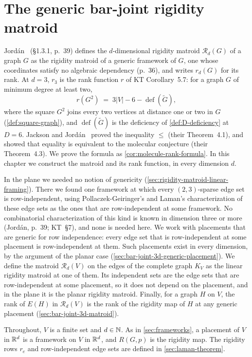 \section{The generic bar-joint rigidity matroid}
\label{sec:bar-joint-3d}

Jord\'an~\cite{jordan2016} (\S1.3.1, p.~39) defines the
$d$-dimensional rigidity matroid $\mathcal{R}_d(G)$ of a graph $G$ as
the rigidity matroid of a generic framework of $G$, one whose
coordinates satisfy no algebraic dependency (p.~36), and writes
$r_d(G)$ for its rank. At $d = 3$, $r_3$ is the rank function $r$ of
KT Corollary~5.7: for a graph $G$ of minimum degree at least two,
\[
  r(G^2) \;=\; 3|V| - 6 - \operatorname{def}(\tilde G),
\]
where the square $G^2$ joins every two vertices at distance one or two
in $G$ (\cref{def:square-graph}), and $\operatorname{def}(\tilde G)$ is
the deficiency of \cref{def:D-deficiency} at $D = 6$. Jackson and
Jord\'an~\cite{jacksonJordan2008} proved the inequality $\le$ (their
Theorem~4.1), and showed that equality is equivalent to the molecular
conjecture (their Theorem~4.3). We prove the formula as
\cref{cor:molecule-rank-formula}. In this chapter we construct the
matroid and its rank function, in every dimension $d$.

In the plane we needed no notion of genericity
(\cref{sec:rigidity-matroid-linear-framing}). There we found one
framework at which every $(2,3)$-sparse edge set is row-independent,
using Pollaczek-Geiringer's and Laman's characterization of these edge
sets as the ones that are row-independent at some framework. No
combinatorial characterization of this kind is known in dimension three
or more (Jord\'an, p.~39; KT~\S7), and none is needed here. We work
with placements that are generic for row independence: every edge set
that is row-independent at some placement is row-independent at them.
Such placements exist in every dimension, by the argument of the planar case
(\cref{sec:bar-joint-3d-generic-placement}). We define the matroid
$\mathcal{R}_d(V)$ on the edges of the complete graph $K_V$ as the
linear rigidity matroid at one of them. Its
independent sets are the edge sets that are row-independent at some
placement, so it does not depend on the placement, and in the plane it
is the planar rigidity matroid. Finally, for a graph $H$ on $V$, the
rank of $E(H)$ in $\mathcal{R}_d(V)$ is the rank of the rigidity map
of $H$ at any generic placement (\cref{sec:bar-joint-3d-matroid}).

Throughout, $V$ is a finite set and $d \in {\mathbb{N}}$. As in
\cref{sec:frameworks}, a placement of $V$ in ${\mathbb{R}}^{d}$ is a framework
on $V$ in ${\mathbb{R}}^{d}$, and $R(G, p)$ is the rigidity map. The rigidity
rows $r_e$ and row-independent edge sets are defined in
\cref{sec:laman-theorem}.

